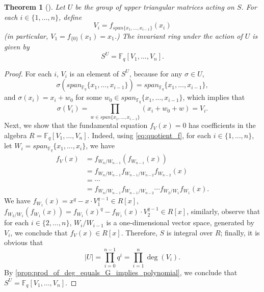 \documentclass[12pt,a4paper]{report}
\newtheorem{theorem}{Theorem}[chapter]
\theoremstyle{definition}
\theoremstyle{remark}
\theoremstyle{definition}
\begin{document}
\begin{theorem}[\cite{mui}]\label{thm:mui_invariants}
    Let $U$ be the group of upper triangular matrices acting on $S$. For each $i\in \{1, \ldots, n\}$, define
    \begin{equation*}
        V_i = f_{span\{x_1, \ldots, x_{i-1}\}}(x_i)
    \end{equation*}
    (in particular, $V_1 = f_{\{0\}}(x_1) = x_1$.) The invariant ring under the action of $U$ is given by
    \begin{equation*}
        S^U = \mathbb{F}_q[V_1, \ldots, V_n].
    \end{equation*}
\end{theorem}
\begin{proof}
    For each $i$, $V_i$ is an element of $S^U$, because for any $\sigma\in U$, 
    \begin{equation*}
        \sigma(span_{\mathbb{F}_q}\{x_1, \ldots, x_{i-1}\}) = span_{\mathbb{F}_q}\{x_1, \ldots, x_{i-1}\},
    \end{equation*}
    and $\sigma(x_i) = x_i + w_0$ for some $w_0\in span_{\mathbb{F}_q}\{x_1, \ldots, x_{i-1}\}$, which implies that
    \begin{equation*}
        \sigma(V_i) = \prod\limits_{w\in span\{x_1, \ldots, x_{i-1}\}}(x_i + w_0 + w)= V_i.
    \end{equation*}
    Next, we show that the fundamental equation $f_V(x) = 0$ has coefficients in the algebra $R = \mathbb{F}_q[V_1, \ldots, V_n]$. Indeed, using \eqref{eq:quotient_f}, for each $i\in \{1, \ldots, n\}$, let $W_i = span_{\mathbb{F}_q}\{x_1, \ldots, x_i\}$, we have
    \begin{align*}
        f_V(x) &= f_{W_n/W_{n-1}}(f_{W_{n-1}}(x))\\
        &=f_{W_n/W_{n-1}}f_{W_{n-1}/W_{n-2}}f_{W_{n-2}}(x)\\
        & = \cdots\\
        &=f_{W_n/W_{n-1}}f_{W_{n-1}/W_{n-2}}\cdots f_{W_{2}/W_1}f_{W_1}(x).
    \end{align*}
    We have $f_{W_1}(x) = x^q - x\cdot V_1^{q-1} \in R[x]$, $f_{W_2/W_1}(f_{W_1}(x)) = f_{W_1}(x)^q - f_{W_1}(x)\cdot V_2^{q-1}\in R[x]$, similarly, observe that for each $i\in \{2, \ldots, n\}$, $W_i/W_{i-1}$ is a one-dimensional vector space, generated by $V_i$, we conclude that $f_V(x)\in R[x]$. Therefore, $S$ is integral over $R$; finally, it is obvious that 
    \begin{equation*}
        |U| = \prod\limits_{i=0}^{n-1}q^i =\prod\limits_{i=1}^{n}\deg(V_i). 
    \end{equation*}
    By \cref{prop:prod_of_deg_equals_G_implies_polynomial}, we conclude that $S^U = \mathbb{F}_q[V_1, \ldots, V_n]$.
\end{proof}
\end{document}
